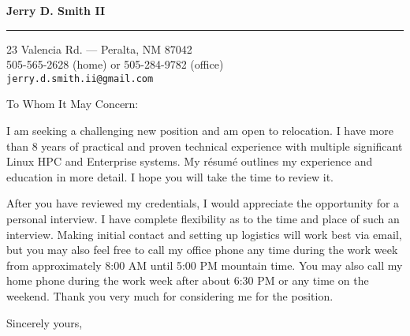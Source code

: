 \documentclass{letter} %
\begin{document}
\newcommand{\me}{Jerry D. Smith II}
\newcommand{\position}{Linux Expert}
\newcommand{\employer}{HPC place}
\newcommand{\via}{somewhere}

\signature{\me}                           %
\longindentation=0pt                      %
\let\raggedleft\raggedright               %


\begin{letter}{}%


\begin{flushleft}
\textbf{\Large\textcolor{MyNameColor}{{\selectfont \me}}}
\end{flushleft}
\medskip\hrule height 1pt
\begin{flushright}
\hfill 23 Valencia Rd. --- Peralta, NM 87042 \\
\hfill 505-565-2628 (home) or 505-284-9782 (office) \\
\hfill \texttt{jerry.d.smith.ii@gmail.com}
\end{flushright}
\vfill %


\opening{To Whom It May Concern:}


\noindent I am seeking a challenging new position and am open to relocation.  I
have more than 8 years of practical and proven technical experience with
multiple significant Linux HPC and Enterprise systems.   My r\'{e}sum\'{e}
outlines my experience and education in more detail.  I hope you will take the
time to review it.

\noindent After you have reviewed my credentials, I would appreciate the
opportunity for a personal interview.  I have complete flexibility as to the
time and place of such an interview.  Making initial contact and setting up
logistics will work best via email, but you may also feel free to call my
office phone any time during the work week from approximately 8:00 AM until 5:00
PM mountain time.  You may also call my home phone during the work week after
about 6:30 PM or any time on the weekend.  Thank you very much for considering
me for the position.

\closing{Sincerely yours,}



\end{letter}
\end{document}
